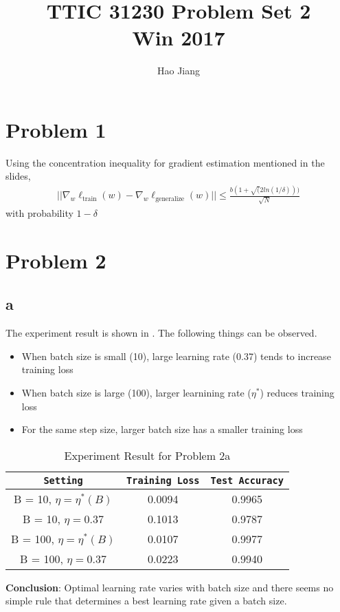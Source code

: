 \documentclass{article}
\title{TTIC 31230 Problem Set 2 \\ Win 2017}
\author{Hao Jiang}
\begin{document}
\maketitle

\section*{Problem 1}
Using the concentration inequality for gradient estimation mentioned in the
slides,
\begin{align*}
||\nabla_w\ell_{\text{train}}(w) - \nabla_w \ell_{\text{generalize}}(w)|| \leq
\frac{b(1+\sqrt(2ln(1/\delta)))}{\sqrt{N}}
\end{align*}
with probability $1-\delta$
\section*{Problem 2}
\subsection*{a}
The experiment result is shown in . The following things can be
observed.
\begin{itemize}
  \item When batch size is small (10), large learning rate (0.37) tends
  to increase training loss
  \item When batch size is large (100), larger learnining rate ($\eta^*$)
  reduces training loss
  \item For the same step size, larger batch size has a smaller training loss
\end{itemize}

\begin{table}
\centering
\begin{tabular}{c|c|c}
\texttt{Setting} & \texttt{Training Loss} & \texttt{Test Accuracy} \\
\hline
B = 10, $\eta = \eta^*(B)$ & 0.0094 & 0.9965 \\
\hline
B = 10, $\eta = 0.37$ & 0.1013 & 0.9787\\
\hline
B = 100, $\eta = \eta^*(B)$ & 0.0107& 0.9977\\
\hline
B = 100, $\eta = 0.37$ & 0.0223 & 0.9940\\
\end{tabular}
\caption{Experiment Result for Problem 2a}
\label{tab:2a}
\end{table}

\textbf{Conclusion}: Optimal learning rate varies with batch size and there
seems no simple rule that determines a best learning rate given a batch size.
\end{document}
